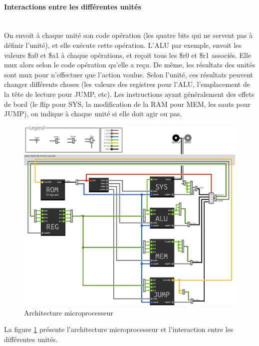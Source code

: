 \documentclass{article}
\begin{document}
\paragraph{Interactions entre les différentes unités}~\\
On envoit à chaque unité son code opération (les quatre bits qui ne servent pas
à définir l'unité), et elle exécute cette opération. L'ALU par exemple, envoit
les valeurs \$a0 et \$a1 à chaque opérations, et reçoit tous les \$r0 et \$r1
associés. Elle mux alors selon le code opération qu'elle a reçu. De même, les
résultats des unités sont mux pour n'effectuer que l'action voulue. Selon
l'unité, ces résultats peuvent changer différents choses (les valeurs des
registres pour l'ALU, l'emplacement de la tête de lecture pour JUMP, etc).
Les instructions ayant généralement des effets de bord (le flip pour SYS,
la modification de la RAM pour MEM, les sauts pour JUMP), on indique à chaque
unité si elle doit agir ou pas.\\

\begin{figure}[h]
\centering
\includegraphics{archi.eps}
\caption{\label{archi} Architecture microprocesseur}
\end{figure}
La figure \ref{archi} présente l'architecture microprocesseur et l'interaction
entre les différentes unités.
\end{document}
